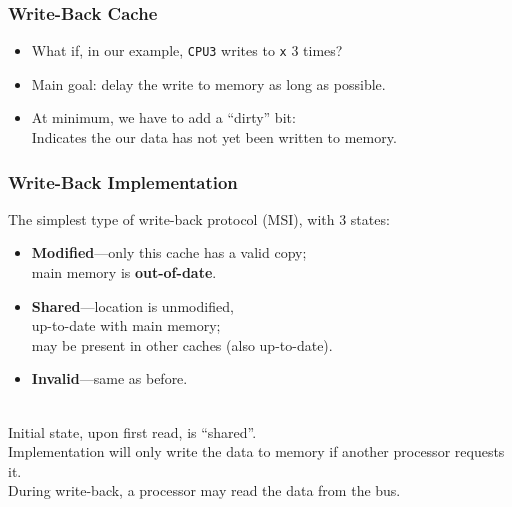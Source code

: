 \begin{frame}
  \frametitle{Write-Back Cache}


  \begin{itemize}
    \item What if, in our example, {\tt CPU3} writes to {\tt x} 3 times?\\[1em]
    \item Main goal: delay the write to memory as long as possible.\\[1em]
    \item At minimum, we have to add a ``dirty'' bit:\\
     \quad Indicates the our data has not yet been written to memory.
  \end{itemize}
  

\end{frame}

\begin{frame}
  \frametitle{Write-Back Implementation}

  
     The simplest type of write-back protocol (MSI), with 3 states:
      \begin{itemize}
        \item {\bf Modified}---only this cache has a valid copy; \\
          \quad main memory is {\bf out-of-date}.
        \item {\bf Shared}---location is unmodified, \\
          \quad up-to-date with main
          memory; \\
          \quad may be present in other caches (also up-to-date).
        \item {\bf Invalid}---same as before.
      \end{itemize}~\\
      
     Initial state, upon first read, is ``shared''.\\[1em]

     Implementation will only write the data to memory if another
        processor requests it.\\[1em]

     During write-back, a processor may read the data from the bus.
  
\end{frame}


